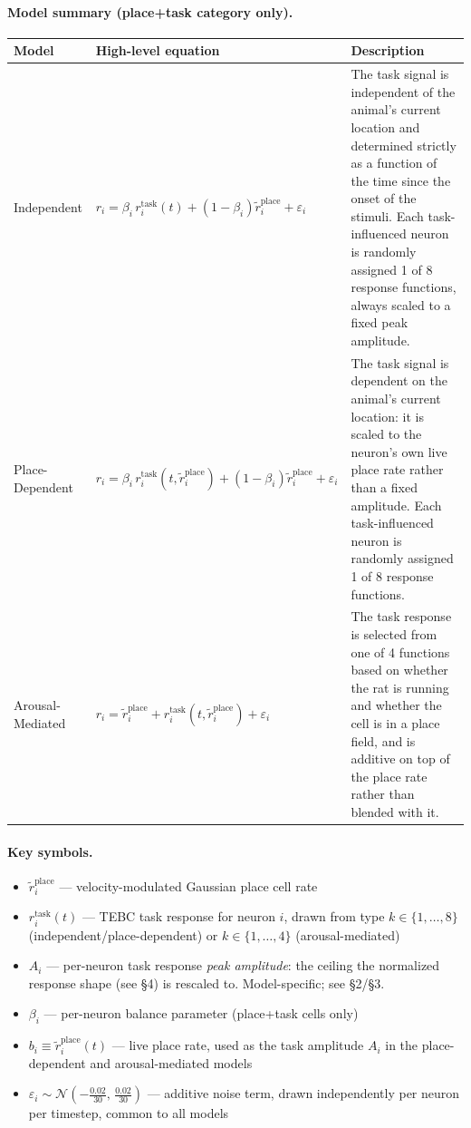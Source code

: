 \documentclass{article}
\begin{document}
\paragraph{Model summary (place+task category only).}

\medskip
\begin{center}
\begin{tabular}{p{2.8cm}p{6.5cm}p{5cm}}
    \hline
    Model & High-level equation & Description \\
    \hline
    Independent &
        $r_i = \beta_i\, r^{\mathrm{task}}_i(t) + (1-\beta_i)\tilde{r}^{\mathrm{place}}_i + \varepsilon_i$ &
        The task signal is independent of the animal's current location and determined strictly as a function of the time since the onset of the stimuli. Each task-influenced neuron is randomly assigned 1 of 8 response functions, always scaled to a fixed peak amplitude. \\[8pt]
    Place-Dependent &
        $r_i = \beta_i\, r^{\mathrm{task}}_i(t,\tilde{r}^{\mathrm{place}}_i) + (1-\beta_i)\tilde{r}^{\mathrm{place}}_i + \varepsilon_i$ &
        The task signal is dependent on the animal's current location: it is scaled to the neuron's own live place rate rather than a fixed amplitude. Each task-influenced neuron is randomly assigned 1 of 8 response functions. \\[8pt]
    Arousal-Mediated &
        $r_i = \tilde{r}^{\mathrm{place}}_i + r^{\mathrm{task}}_i(t,\tilde{r}^{\mathrm{place}}_i) + \varepsilon_i$ &
        The task response is selected from one of 4 functions based on whether the rat is running and whether the cell is in a place field, and is additive on top of the place rate rather than blended with it. \\
    \hline
\end{tabular}
\end{center}

\paragraph{Key symbols.}
\begin{itemize}
    \item $\tilde{r}^{\mathrm{place}}_i$ --- velocity-modulated Gaussian place cell rate
    \item $r^{\mathrm{task}}_i(t)$ --- TEBC task response for neuron $i$, drawn from type $k \in \{1,\dots,8\}$ (independent/place-dependent) or $k \in \{1,\dots,4\}$ (arousal-mediated)
    \item $A_i$ --- per-neuron task response \emph{peak amplitude}: the ceiling the normalized response shape (see \S4) is rescaled to. Model-specific; see \S2/\S3.
    \item $\beta_i$ --- per-neuron balance parameter (place+task cells only)
    \item $b_i \equiv \tilde{r}^{\mathrm{place}}_i(t)$ --- live place rate, used as the task amplitude $A_i$ in the place-dependent and arousal-mediated models
    \item $\varepsilon_i \sim \mathcal{N}\!\left(-\tfrac{0.02}{30},\, \tfrac{0.02}{30}\right)$ --- additive noise term, drawn independently per neuron per timestep, common to all models
\end{itemize}
\end{document}
